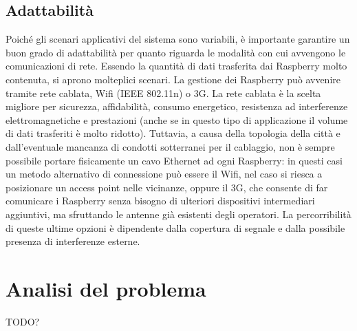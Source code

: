 \subsection{Adattabilità}
Poiché gli scenari applicativi del sistema sono variabili, è importante garantire un buon grado di adattabilità per quanto riguarda le modalità con cui avvengono le comunicazioni di rete. Essendo la quantità di dati trasferita dai Raspberry molto contenuta, si aprono molteplici scenari. La gestione dei Raspberry può avvenire tramite rete cablata, Wifi (IEEE 802.11n) o 3G. La rete cablata è la scelta migliore per sicurezza, affidabilità, consumo energetico, resistenza ad interferenze elettromagnetiche e prestazioni (anche se in questo tipo di applicazione il volume di dati trasferiti è molto ridotto). Tuttavia, a causa della topologia della città e dall’eventuale mancanza di condotti sotterranei per il cablaggio, non è sempre possibile portare fisicamente un cavo Ethernet ad ogni Raspberry: in questi casi un metodo alternativo di connessione può essere il Wifi, nel caso si riesca a posizionare un access point nelle vicinanze, oppure il 3G, che consente di far comunicare i Raspberry senza bisogno di ulteriori dispositivi intermediari aggiuntivi, ma sfruttando le antenne già esistenti degli operatori. La percorribilità di queste ultime opzioni è dipendente dalla copertura di segnale e dalla possibile presenza di interferenze esterne.

\section{Analisi del problema}
TODO?
